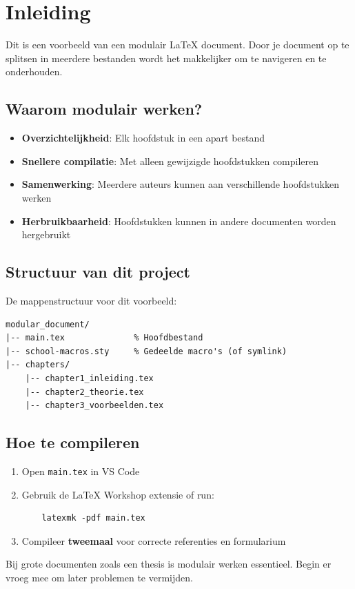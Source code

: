
\chapter{Inleiding}
\label{ch:inleiding}

Dit is een voorbeeld van een modulair LaTeX document. Door je document op te splitsen
in meerdere bestanden wordt het makkelijker om te navigeren en te onderhouden.

\section{Waarom modulair werken?}

\begin{conceptbox}[title=Voordelen van modulaire documenten]
\begin{itemize}
    \item \textbf{Overzichtelijkheid}: Elk hoofdstuk in een apart bestand
    \item \textbf{Snellere compilatie}: Met \verb|| alleen gewijzigde hoofdstukken compileren
    \item \textbf{Samenwerking}: Meerdere auteurs kunnen aan verschillende hoofdstukken werken
    \item \textbf{Herbruikbaarheid}: Hoofdstukken kunnen in andere documenten worden hergebruikt
\end{itemize}
\end{conceptbox}

\section{Structuur van dit project}

De mappenstructuur voor dit voorbeeld:
\begin{verbatim}
modular_document/
|-- main.tex              % Hoofdbestand
|-- school-macros.sty     % Gedeelde macro's (of symlink)
|-- chapters/
    |-- chapter1_inleiding.tex
    |-- chapter2_theorie.tex
    |-- chapter3_voorbeelden.tex
\end{verbatim}

\section{Hoe te compileren}

\begin{oefenblok}
\begin{enumerate}
    \item Open \texttt{main.tex} in VS Code
    \item Gebruik de LaTeX Workshop extensie of run:
    \begin{verbatim}
    latexmk -pdf main.tex
    \end{verbatim}
    \item Compileer \textbf{tweemaal} voor correcte referenties en formularium
\end{enumerate}
\end{oefenblok}

\begin{examenbox}
Bij grote documenten zoals een thesis is modulair werken essentieel. 
Begin er vroeg mee om later problemen te vermijden.
\end{examenbox}
